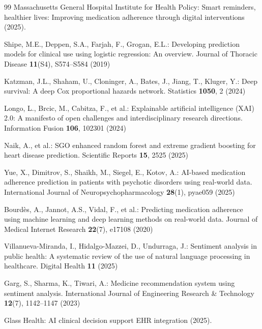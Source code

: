 \documentclass{article}
\begin{document}
\begin{thebibliography}{99}
Massachusetts General Hospital Institute for Health Policy: Smart reminders, healthier lives: Improving medication adherence through digital interventions (2025). 

Shipe, M.E., Deppen, S.A., Farjah, F., Grogan, E.L.: Developing prediction models for clinical use using logistic regression: An overview. Journal of Thoracic Disease \textbf{11}(S4), S574--S584 (2019)

Katzman, J.L., Shaham, U., Cloninger, A., Bates, J., Jiang, T., Kluger, Y.: Deep survival: A deep Cox proportional hazards network. Statistics \textbf{1050}, 2 (2024)

Longo, L., Brcic, M., Cabitza, F., et al.: Explainable artificial intelligence (XAI) 2.0: A manifesto of open challenges and interdisciplinary research directions. Information Fusion \textbf{106}, 102301 (2024)


Naik, A., et al.: SGO enhanced random forest and extreme gradient boosting for heart disease prediction. Scientific Reports \textbf{15}, 2525 (2025)

Yue, X., Dimitrov, S., Shaikh, M., Siegel, E., Kotov, A.: AI-based medication adherence prediction in patients with psychotic disorders using real-world data. International Journal of Neuropsychopharmacology \textbf{28}(1), pyae059 (2025)

Bourdès, A., Jannot, A.S., Vidal, F., et al.: Predicting medication adherence using machine learning and deep learning methods on real-world data. Journal of Medical Internet Research \textbf{22}(7), e17108 (2020)


Villanueva-Miranda, I., Hidalgo-Mazzei, D., Undurraga, J.: Sentiment analysis in public health: A systematic review of the use of natural language processing in healthcare. Digital Health \textbf{11} (2025)

Garg, S., Sharma, K., Tiwari, A.: Medicine recommendation system using sentiment analysis. International Journal of Engineering Research \& Technology \textbf{12}(7), 1142--1147 (2023)

Glass Health: AI clinical decision support EHR integration (2025).

\end{thebibliography}
\end{document}
